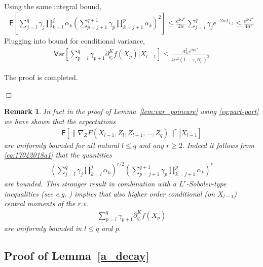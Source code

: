 \documentclass[bj]{imsart}
\newcommand{\proofendsign}{$\Box$}
\newtheorem{remark}{Remark}
\newenvironment{proof}{{\noindent \bf Proof }}
 {{\hspace*{\fill}\proofendsign\par\bigskip}}
\begin{document}
\begin{proof}
\begin{align*}
\end{align*}
Using the same integral bound, 
\begin{align*}
\mathsf{E}\left[\sum_{j=l}^{q}\gamma_{j}\prod_{k=l}^{j}\alpha_{k}\left(\sum_{p=j+1}^{q+1}\gamma_{p}\prod_{k=j+1}^{p}\alpha_{k}\right)^{2}\right] \leq
\frac{e^{2\kappa \Gamma^*}}{2\alpha}\sum_{j=l}^{q}\gamma_{j}e^{-2\alpha \Gamma_{l,j}} \leq \frac{e^{2\kappa \Gamma^*}}{4\alpha^2}
\end{align*}
Plugging into bound for conditional variance, 
\begin{align*}
\mathsf{Var}\left[\sum_{p=l}^{q}\gamma_{p+1}\partial_{y_{l}}^{K}f\left(X_{p}\right)\Big|X_{l-1}\right] \leq
\frac{A_{K}^{2}e^{2\kappa \Gamma^*}}{4\alpha^2(1-\gamma_1 B_\mu)^3}
\end{align*}
\par
The proof is completed.
\end{proof}
\begin{remark}\label{rem:p-norm}
In fact in the proof of Lemma~\ref{lem:var_poincare} using \eqref{eq:part-part} we have shown that the expectations
\begin{eqnarray*}
\mathsf E\left[\left.
\|\nabla_Z F(X_{l-1},Z_l,Z_{l+1},\ldots,Z_q)\|^r
\right|X_{l-1}\right]
\end{eqnarray*}
are uniformly bounded for all natural \(l\leq q\) and any \(r\geq 2.\) Indeed it follows from \eqref{eq:17042018a1} that  the quantities
\begin{eqnarray*}
\left(\sum_{j=l}^{q} \gamma_{j}
\prod_{k=l}^{j} \alpha_{k}\right)^{r/2}
\left(
\sum_{p=j+1}^{q+1} \gamma_{p} \prod_{k=j+1}^{p} \alpha_{k}
\right)^{r}
\end{eqnarray*}
are bounded. This stronger result in combination with a \(L^r\)-Sobolev-type inequalities (see e.g. \cite{Adamczak}) implies that also higher order conditional (on \(X_{l-1}\)) central moments of the r.v.
\begin{eqnarray*}
\sum_{p=l}^{q}\gamma_{p+1}\partial_{y_{l}}^{K}f\left(X_{p}\right)
\end{eqnarray*}
are uniformly bounded in \(l\leq q\) and \(p.\)

\end{remark}

\subsection{Proof of Lemma~\ref{a_decay}}
\end{document}
